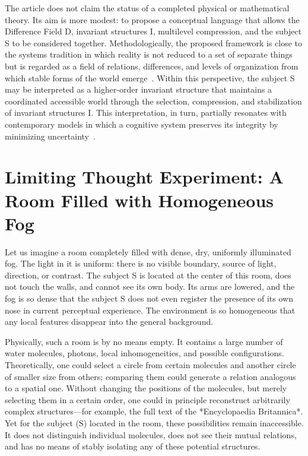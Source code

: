 \documentclass[aps,prd,onecolumn,nofootinbib,superscriptaddress]{revtex4-2}
\begin{document}
The article does not claim the status of a completed physical or mathematical theory. Its aim is more modest: to propose a conceptual language that allows the Difference Field D, invariant structures I, multilevel compression, and the subject S to be considered together. Methodologically, the proposed framework is close to the systems tradition in which reality is not reduced to a set of separate things but is regarded as a field of relations, differences, and levels of organization from which stable forms of the world emerge~\cite{Bateson1972}. Within this perspective, the subject S may be interpreted as a higher-order invariant structure that maintains a coordinated accessible world through the selection, compression, and stabilization of invariant structures I. This interpretation, in turn, partially resonates with contemporary models in which a cognitive system preserves its integrity by minimizing uncertainty~\cite{Friston2010}.

\section{Limiting Thought Experiment: A Room Filled with Homogeneous Fog}
Let us imagine a room completely filled with dense, dry, uniformly illuminated fog. The light in it is uniform: there is no visible boundary, source of light, direction, or contrast. The subject S is located at the center of this room, does not touch the walls, and cannot see its own body. Its arms are lowered, and the fog is so dense that the subject S does not even register the presence of its own nose in current perceptual experience. The environment is so homogeneous that any local features disappear into the general background.

Physically, such a room is by no means empty. It contains a large number of water molecules, photons, local inhomogeneities, and possible configurations. Theoretically, one could select a circle from certain molecules and another circle of smaller size from others; comparing them could generate a relation analogous to a spatial one. Without changing the positions of the molecules, but merely selecting them in a certain order, one could in principle reconstruct arbitrarily complex structures—for example, the full text of the *Encyclopaedia Britannica*. Yet for the subject (S) located in the room, these possibilities remain inaccessible. It does not distinguish individual molecules, does not see their mutual relations, and has no means of stably isolating any of these potential structures.
\end{document}
